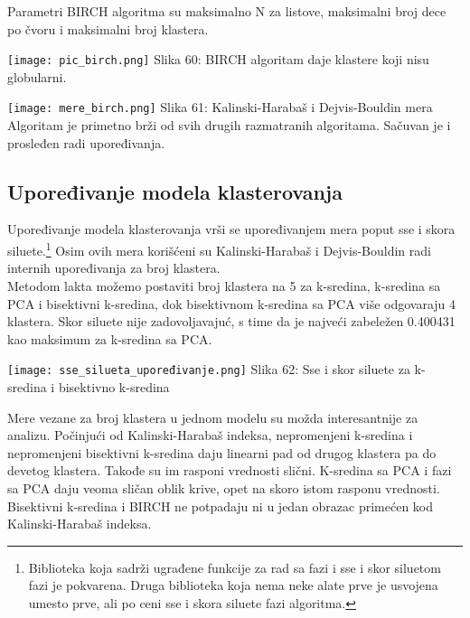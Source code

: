 \documentclass[a4paper]{article}
\begin{document}
{\begin{minipage}{0.45\textwidth}
Parametri BIRCH algoritma su maksimalno N za listove, maksimalni broj dece po čvoru i maksimalni broj klastera.\\
\end{minipage}
\noindent\begin{minipage}{0.05\textwidth}
\hphantom{a}
\end{minipage}
\noindent\begin{minipage}{0.48\textwidth}
\texttt{[image: pic\_birch.png]}
Slika 60: BIRCH algoritam daje klastere koji nisu globularni.\\
\end{minipage}

\texttt{[image: mere\_birch.png]}
\hphantom{aaaaaaaaaaaaaaaaaaaaaaaaa}Slika 61: Kalinski-Harabaš i Dejvis-Bouldin mera\\

Algoritam je primetno brži od svih drugih razmatranih algoritama. Sačuvan je i prosleđen radi upoređivanja.

\subsection{Upoređivanje modela klasterovanja}
\label{upoređivanje_modela_klasterovanja}

Upoređivanje modela klasterovanja vrši se upoređivanjem mera poput sse i skora siluete.\footnote[9]{Biblioteka koja sadrži ugrađene funkcije za rad sa fazi i sse i skor siluetom fazi je pokvarena. Druga biblioteka koja nema neke alate prve je usvojena umesto prve, ali po ceni sse i skora siluete fazi algoritma.} Osim ovih mera korišćeni su Kalinski-Harabaš i Dejvis-Bouldin radi internih upoređivanja za broj klastera.\\

Metodom lakta možemo postaviti broj klastera na 5 za k-sredina, k-sredina sa PCA i bisektivni k-sredina, dok bisektivnom k-sredina sa PCA više odgovaraju 4 klastera. Skor siluete nije zadovoljavajuć, s time da je najveći zabeležen 0.400431 kao maksimum za k-sredina sa PCA.

\noindent\begin{minipage}{0.9\textwidth}
\texttt{[image: sse\_silueta\_upoređivanje.png]}
\hphantom{aaaaaaaaaaaaa}Slika 62: Sse i skor siluete za k-sredina i bisektivno k-sredina\\
\end{minipage}

Mere vezane za broj klastera u jednom modelu su možda interesantnije za analizu. Počinjući od Kalinski-Harabaš indeksa, nepromenjeni k-sredina i nepromenjeni bisektivni k-sredina daju linearni pad od drugog klastera pa do devetog klastera. Takođe su im rasponi vrednosti slični. K-sredina sa PCA i fazi sa PCA daju veoma sličan oblik krive, opet na skoro istom rasponu vrednosti. Bisektivni k-sredina i BIRCH ne potpadaju ni u jedan obrazac primećen kod Kalinski-Harabaš indeksa.

}
\end{document}
